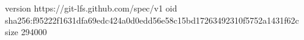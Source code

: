 version https://git-lfs.github.com/spec/v1
oid sha256:f95222f1631dfa69edc424a0d0edd56e58c15bd17263492310f5752a1431f62c
size 294000
